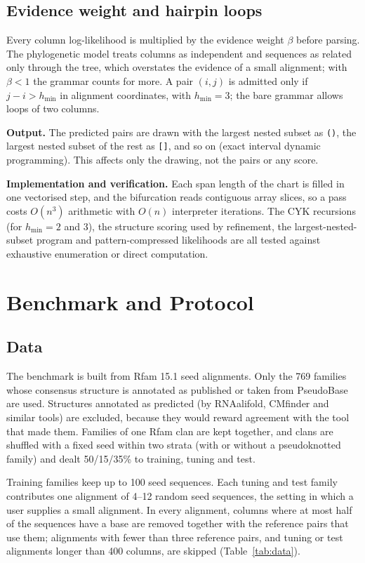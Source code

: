 \documentclass[10pt, twocolumn]{article}
\newcommand{\hmin}{h_{\min}}
\begin{document}
\subsection{Evidence weight and hairpin loops}
\label{sec:weight}
Every column log-likelihood is multiplied by the evidence weight $\beta$ before parsing. The phylogenetic model treats columns as independent and sequences as related only through the tree, which overstates the evidence of a small alignment; with $\beta<1$ the grammar counts for more. A pair $(i,j)$ is admitted only if $j-i>\hmin$ in alignment coordinates, with $\hmin=3$; the bare grammar allows loops of two columns.

\textbf{Output.} The predicted pairs are drawn with the largest nested subset as \texttt{()}, the largest nested subset of the rest as \texttt{[]}, and so on (exact interval dynamic programming). This affects only the drawing, not the pairs or any score.

\textbf{Implementation and verification.} Each span length of the chart is filled in one vectorised step, and the bifurcation reads contiguous array slices, so a pass costs $O(n^3)$ arithmetic with $O(n)$ interpreter iterations. The CYK recursions (for $\hmin=2$ and $3$), the structure scoring used by refinement, the largest-nested-subset program and pattern-compressed likelihoods are all tested against exhaustive enumeration or direct computation.

\section{Benchmark and Protocol}
\label{sec:benchmark}
\subsection{Data}
The benchmark is built from Rfam 15.1 \cite{kalvari2021rfam} seed alignments. Only the 769 families whose consensus structure is annotated as published or taken from PseudoBase \cite{vanbatenburg2000pseudobase} are used. Structures annotated as predicted (by RNAalifold, CMfinder and similar tools) are excluded, because they would reward agreement with the tool that made them. Families of one Rfam clan are kept together, and clans are shuffled with a fixed seed within two strata (with or without a pseudoknotted family) and dealt 50/15/35\% to training, tuning and test.

Training families keep up to 100 seed sequences. Each tuning and test family contributes one alignment of 4--12 random seed sequences, the setting in which a user supplies a small alignment. In every alignment, columns where at most half of the sequences have a base are removed together with the reference pairs that use them; alignments with fewer than three reference pairs, and tuning or test alignments longer than 400 columns, are skipped (Table~\ref{tab:data}).
\end{document}
